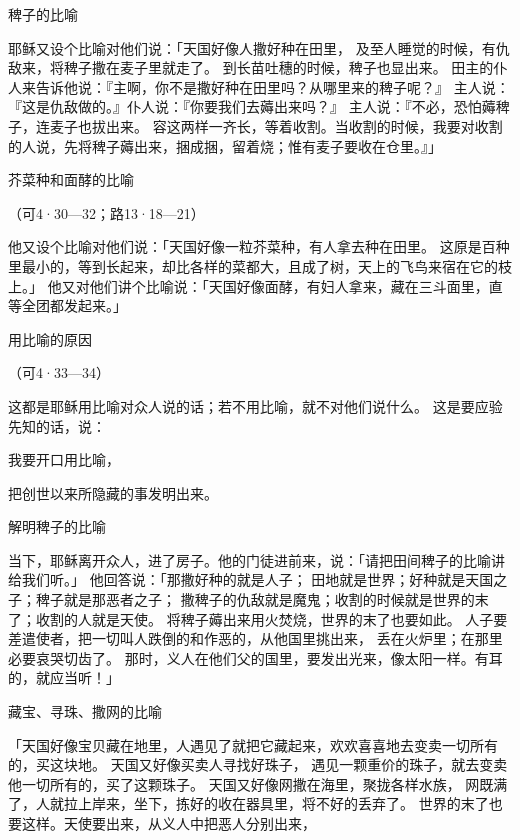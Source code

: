 {\par }{\SH 稗子的比喻
\par }{\PP {}耶稣又设个比喻对他们说：「天国好像人撒好种在田里，
及至人睡觉的时候，有仇敌来，将稗子撒在麦子里就走了。
到长苗吐穗的时候，稗子也显出来。
田主的仆人来告诉他说：『主啊，你不是撒好种在田里吗？从哪里来的稗子呢？』
主人说：『这是仇敌做的。』仆人说：『你要我们去薅出来吗？』
主人说：『不必，恐怕薅稗子，连麦子也拔出来。
容这两样一齐长，等着收割。当收割的时候，我要对收割的人说，先将稗子薅出来，捆成捆，留着烧；惟有麦子要收在仓里。』」
\par }{\SH 芥菜种和面酵的比喻
\par }{\R （可4·30—32；路13·18—21）
\par }{\PP {}他又设个比喻对他们说：「天国好像一粒芥菜种，有人拿去种在田里。
这原是百种里最小的，等到长起来，却比各样的菜都大，且成了树，天上的飞鸟来宿在它的枝上。」
他又对他们讲个比喻说：「天国好像面酵，有妇人拿来，藏在三斗面里，直等全团都发起来。」
\par }{\SH 用比喻的原因
\par }{\R （可4·33—34）
\par }{\PP {}这都是耶稣用比喻对众人说的话；若不用比喻，就不对他们说什么。
这是要应验先知的话，说：
\par }{\Q 我要开口用比喻，
\par }{\Q 把创世以来所隐藏的事发明出来。
\par }{\SH 解明稗子的比喻
\par }{\PP {}当下，耶稣离开众人，进了房子。他的门徒进前来，说：「请把田间稗子的比喻讲给我们听。」
他回答说：「那撒好种的就是人子；
田地就是世界；好种就是天国之子；稗子就是那恶者之子；
撒稗子的仇敌就是魔鬼；收割的时候就是世界的末了；收割的人就是天使。
将稗子薅出来用火焚烧，世界的末了也要如此。
人子要差遣使者，把一切叫人跌倒的和作恶的，从他国里挑出来，
丢在火炉里；在那里必要哀哭切齿了。
那时，义人在他们父的国里，要发出光来，像太阳一样。有耳{}的，就应当听！」
\par }{\SH 藏宝、寻珠、撒网的比喻
\par }{\PP {}「天国好像宝贝藏在地里，人遇见了就把它藏起来，欢欢喜喜地去变卖一切所有的，买这块地。
天国又好像买卖人寻找好珠子，
遇见一颗重价的珠子，就去变卖他一切所有的，买了这颗珠子。
天国又好像网撒在海里，聚拢各样水族，
网既满了，人就拉上岸来，坐下，拣好的收在器具里，将不好的丢弃了。
世界的末了也要这样。天使要出来，从义人中把恶人分别出来，
}

